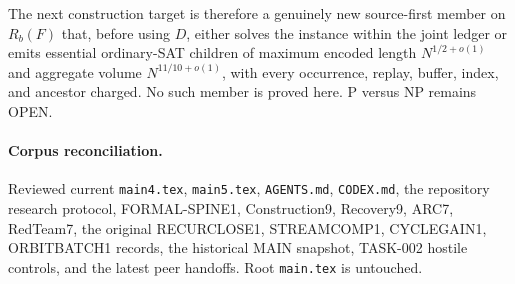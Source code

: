 \documentclass[11pt]{article}
\begin{document}
The next construction target is therefore a genuinely new source-first
member on $R_b(F)$ that, before using $D$, either solves the instance within
the joint ledger or emits essential ordinary-SAT children of maximum encoded
length $N^{1/2+o(1)}$ and aggregate volume $N^{11/10+o(1)}$, with every
occurrence, replay, buffer, index, and ancestor charged.  No such member is
proved here.  P versus NP remains OPEN.

\paragraph{Corpus reconciliation.}
Reviewed current \texttt{main4.tex}, \texttt{main5.tex}, \texttt{AGENTS.md},
\texttt{CODEX.md}, the repository research protocol, FORMAL-SPINE1,
Construction9, Recovery9, ARC7, RedTeam7, the original RECURCLOSE1,
STREAMCOMP1, CYCLEGAIN1, ORBITBATCH1 records, the historical MAIN snapshot,
TASK-002 hostile controls, and the latest peer handoffs.  Root
\texttt{main.tex} is untouched.
\end{document}
